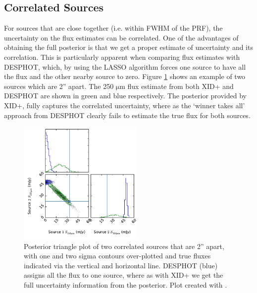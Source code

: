 \documentclass[useAMS,usenatbib]{mnras}
\begin{document}
\subsection{Correlated Sources}
For sources that are close together (i.e. within FWHM of the PRF), the uncertainty on the flux estimates can be correlated. One of the advantages of obtaining the full posterior is that we get a proper estimate of uncertainty and its correlation. This is particularly apparent when comparing flux estimates with \textsc{DESPHOT}, which, by using the LASSO algorithm forces one source to have all the flux and the other nearby source to zero. Figure \ref{fig:corr} shows an example of two sources which are 2'' apart. The 250 $\mathrm{\mu m}$ flux estimate from both \textsc{XID+} and \textsc{DESPHOT} are shown in green and blue respectively. The posterior provided by XID+, fully captures the correlated uncertainty, where as the `winner takes all' approach from \textsc{DESPHOT} clearly fails to estimate the true flux for both sources.
 
\begin{figure} 
\includegraphics[width=6cm]{example_tri_DESHPOT_XIDp.pdf}
\caption{Posterior triangle plot of two correlated sources that are 2'' apart, with one and two sigma contours over-plotted and true fluxes indicated via the vertical and horizontal line. \textsc{DESPHOT} (blue) assigns all the flux to one source, where as with \textsc{XID+} we get the full uncertainty information from the posterior. Plot created with \protect\cite{triangle}.}\label{fig:corr}
\end{figure}
\end{document}

